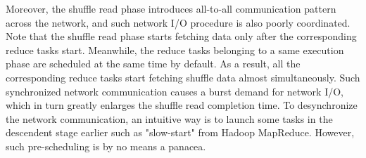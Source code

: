 Moreover, the shuffle read phase introduces all-to-all communication pattern across the network, and such network I/O procedure is also poorly coordinated.
Note that the shuffle read phase starts fetching data only after the corresponding reduce tasks start.
Meanwhile, the reduce tasks belonging to a same execution phase are scheduled at the same time by default. 
As a result, all the corresponding reduce tasks start fetching shuffle data almost simultaneously.
Such synchronized network communication causes a burst demand for network I/O, which in turn greatly enlarges the shuffle read completion time. 
To desynchronize the network communication, an intuitive way is to launch some tasks in the descendent stage earlier such as "slow-start" from Hadoop MapReduce\cite{hadoop}. 
However, such pre-scheduling is by no means a panacea. 



